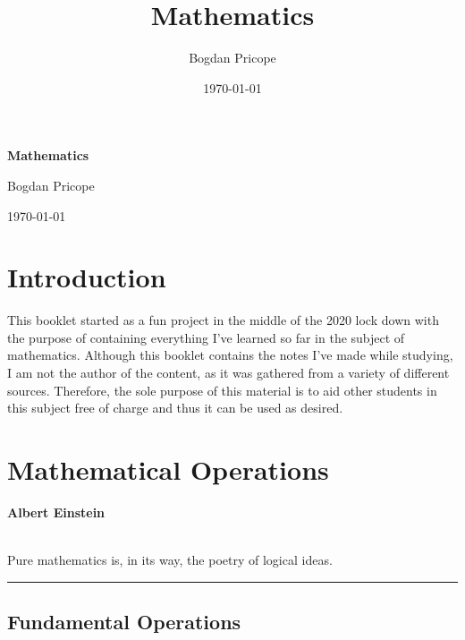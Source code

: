 \documentclass[a5paper,9pt]{book}
\title{Mathematics}
\author{Bogdan Pricope}
\date{\today}
\theoremstyle{definition}
\renewcommand{\maketitle}{%
    \begin{titlepage}
        \begin{center}
            \vspace*{\fill}

            {\Huge\textbf{Mathematics}}

            \vspace*{3\bigskipamount}

            {\LARGE Bogdan Pricope}

            \vspace*{1.25\bigskipamount}

            {\large\today}

            \vspace*{\fill}
        \end{center}
    \end{titlepage}
}%
\newcommand{\qq}[2]{%
    \begin{center}

        \begin{minipage}{0.75\textwidth}

          \hrulefill\hspace{2.5mm}\textbf{#2}\hspace{2.5mm}\hrulefill\medskip

          \hspace*{\fill}{\Large\textbf{``}}\hspace*{\fill} \\
          #1 \\[\baselineskip]
          \hspace*{\fill}{\Large\textbf{''}}\hspace*{\fill}

          \smallskip\hrule

        \end{minipage}

    \end{center}
}
\begin{document}
    \maketitle

    \tableofcontents%
    \listoffigures%
    \listoftables%
    \newpage

    \chapter*{Introduction}

        This booklet started as a fun project in the middle of the 2020 lock down with
        the purpose of containing everything I've learned so far in the subject of mathematics.
        Although this booklet contains the notes I've made while studying, I am not the
        author of the content, as it was gathered from a variety of different sources.
        Therefore, the sole purpose of this material is to aid other students in this
        subject free of charge and thus it can be used as desired.

    \newpage

    \pagestyle{fancy}


    \chapter{Mathematical Operations}%
        \label{chap:mathematical_operations}
        \qq{Pure mathematics is, in its way, the poetry of logical ideas.}
        {Albert Einstein}
        \newpage

        \section{Fundamental Operations}%
            \label{sec:fundamental_operations}
\end{document}
